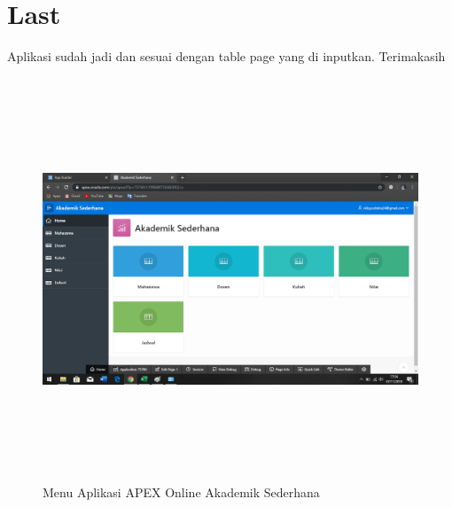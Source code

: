 \documentclass[a4, 13pt]{article}
\begin{document}
\section{Last}
Aplikasi sudah jadi dan sesuai dengan table page yang di inputkan. Terimakasih
  \begin{figure}[!htbp]
        \centering
        \includegraphics[width=16cm, height=12cm]{pictures/o.png}
        \caption{Menu Aplikasi APEX Online Akademik Sederhana}
        \label{fig:my_label}
    \end{figure}
\end{document}
